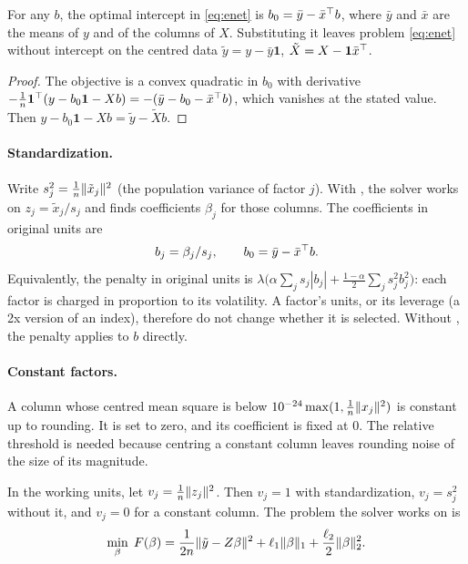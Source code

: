 \documentclass[11pt,a4paper]{article}
\begin{document}
\begin{proposition}[Intercept]\label{prop:intercept}
For any $b$, the optimal intercept in \eqref{eq:enet} is $b_0=\bar y-\bar x^\top b$, where
$\bar y$ and $\bar x$ are the means of $y$ and of the columns of $X$. Substituting it
leaves problem \eqref{eq:enet} without intercept on the centred data
$\tilde y=y-\bar y\mathbf 1$, $\tilde X=X-\mathbf 1\bar x^\top$.
\end{proposition}
\begin{proof}
The objective is a convex quadratic in $b_0$ with derivative
$-\frac1n\mathbf 1^\top(y-b_0\mathbf 1-Xb)=-(\bar y-b_0-\bar x^\top b)$, which vanishes at the stated
value. Then $y-b_0\mathbf 1-Xb=\tilde y-\tilde Xb$.
\end{proof}

\paragraph{Standardization.} Write $s_j^2=\frac1n\lVert \tilde x_j\rVert^2$ (the population variance
of factor $j$). With , the solver works on $z_j=\tilde x_j/s_j$ and finds
coefficients $\beta_j$ for those columns. The coefficients in original units are
\[
  b_j=\beta_j/s_j,\qquad b_0=\bar y-\bar x^\top b.
\]
Equivalently, the penalty in original units is
$\lambda\big(\alpha\sum_js_j|b_j|+\tfrac{1-\alpha}2\sum_js_j^2b_j^2\big)$: each factor is
charged in proportion to its volatility. A factor's units, or its leverage (a 2x version of
an index), therefore do not change whether it is selected. Without , the
penalty applies to $b$ directly.

\paragraph{Constant factors.} A column whose centred mean square is below
$10^{-24}\max(1,\frac1n\lVert x_j\rVert^2)$ is constant up to rounding. It is set to zero, and its
coefficient is fixed at $0$. The relative threshold is needed because centring a constant
column leaves rounding noise of the size of its magnitude.

In the working units, let $v_j=\frac1n\lVert z_j\rVert^2$. Then $v_j=1$ with standardization,
$v_j=s_j^2$ without it, and $v_j=0$ for a constant column. The problem the solver works on is
\begin{equation}\label{eq:working}
  \min_\beta\;F(\beta)=\frac1{2n}\lVert \tilde y-Z\beta\rVert^2+\ell_1\lVert \beta\rVert_1+\frac{\ell_2}2\lVert \beta\rVert_2^2 .
\end{equation}
\end{document}
